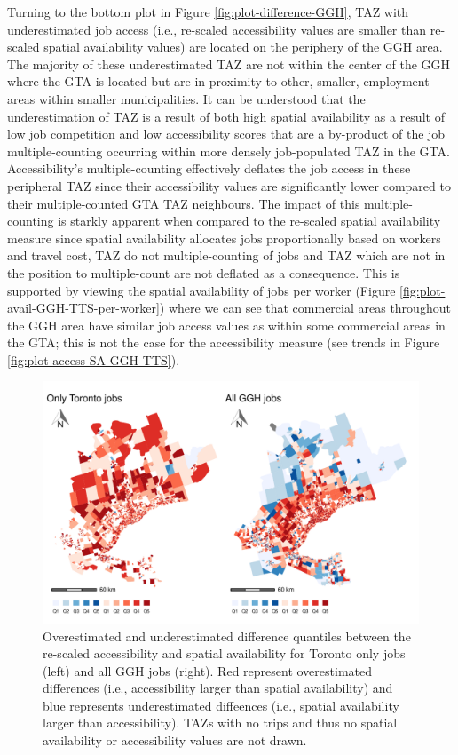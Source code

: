 \documentclass[]{elsarticle} %
\begin{document}
Turning to the bottom plot in Figure \ref{fig:plot-difference-GGH}, TAZ
with underestimated job access (i.e., re-scaled accessibility values are
smaller than re-scaled spatial availability values) are located on the
periphery of the GGH area. The majority of these underestimated TAZ are
not within the center of the GGH where the GTA is located but are in
proximity to other, smaller, employment areas within smaller
municipalities. It can be understood that the underestimation of TAZ is
a result of both high spatial availability as a result of low job
competition and low accessibility scores that are a by-product of the
job multiple-counting occurring within more densely job-populated TAZ in
the GTA. Accessibility's multiple-counting effectively deflates the job
access in these peripheral TAZ since their accessibility values are
significantly lower compared to their multiple-counted GTA TAZ
neighbours. The impact of this multiple-counting is starkly apparent
when compared to the re-scaled spatial availability measure since
spatial availability allocates jobs proportionally based on workers and
travel cost, TAZ do not multiple-counting of jobs and TAZ which are not
in the position to multiple-count are not deflated as a consequence.
This is supported by viewing the spatial availability of jobs per worker
(Figure \ref{fig:plot-avail-GGH-TTS-per-worker}) where we can see that
commercial areas throughout the GGH area have similar job access values
as within some commercial areas in the GTA; this is not the case for the
accessibility measure (see trends in Figure
\ref{fig:plot-access-SA-GGH-TTS}).

\newpage

\begin{figure}
\includegraphics[width=1\linewidth]{Spatial-Availability_files/figure-latex/plot-diff-Toronto-vs-GGH-1} \caption{\label{fig:plot-diff-Toronto-vs-GGH}Overestimated and underestimated difference quantiles between the re-scaled accessibility and spatial availability for Toronto only jobs (left) and all GGH jobs (right). Red represent overestimated differences (i.e., accessibility larger than spatial availability) and blue represents underestimated diffeences (i.e., spatial availability larger than accessibility). TAZs with no trips and thus no spatial availability or accessibility values are not drawn.}\label{fig:plot-diff-Toronto-vs-GGH}
\end{figure}
\end{document}
